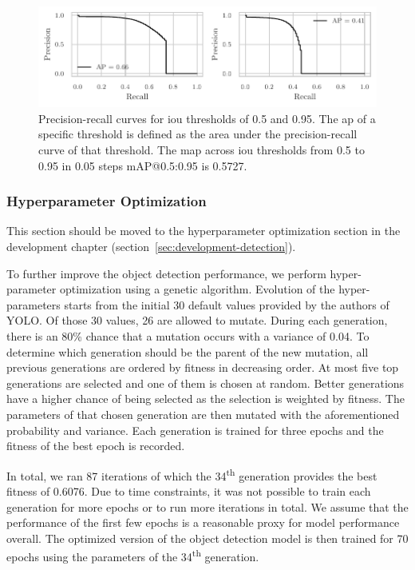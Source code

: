 \documentclass[draft,final]{vutinfth} %
\begin{document}
\begin{figure}
  \centering
  \includegraphics{graphics/APpt5-pt95.pdf}
  \caption[Object detection AP@0.5 and AP@0.95.]{Precision-recall
    curves for \gls{iou} thresholds of 0.5 and 0.95. The \gls{ap} of a
    specific threshold is defined as the area under the
    precision-recall curve of that threshold. The \gls{map} across
    \gls{iou} thresholds from 0.5 to 0.95 in 0.05 steps
    \textsf{mAP}@0.5:0.95 is 0.5727.}
  \label{fig:yolo-ap}
\end{figure}

\subsubsection{Hyperparameter Optimization}
\label{sssec:yolo-hyp-opt}

This section should be moved to the hyperparameter optimization
section in the development chapter
(section~\ref{sec:development-detection}).

To further improve the object detection performance, we perform
hyper-parameter optimization using a genetic algorithm. Evolution of
the hyper-parameters starts from the initial 30 default values
provided by the authors of YOLO. Of those 30 values, 26 are allowed to
mutate. During each generation, there is an 80\% chance that a
mutation occurs with a variance of 0.04. To determine which generation
should be the parent of the new mutation, all previous generations are
ordered by fitness in decreasing order. At most five top generations
are selected and one of them is chosen at random. Better generations
have a higher chance of being selected as the selection is weighted by
fitness. The parameters of that chosen generation are then mutated
with the aforementioned probability and variance. Each generation is
trained for three epochs and the fitness of the best epoch is
recorded.

In total, we ran 87 iterations of which the 34\textsuperscript{th}
generation provides the best fitness of 0.6076. Due to time
constraints, it was not possible to train each generation for more
epochs or to run more iterations in total. We assume that the
performance of the first few epochs is a reasonable proxy for model
performance overall. The optimized version of the object detection
model is then trained for 70 epochs using the parameters of the
34\textsuperscript{th} generation.
\end{document}
